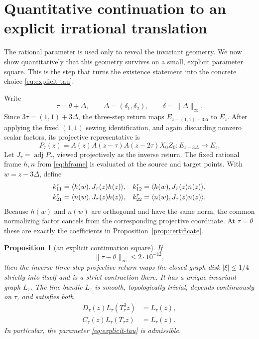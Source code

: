 \documentclass[11pt]{amsart}
\newtheorem{proposition}[theorem]{Proposition}
\theoremstyle{remark}
\newcommand{\adj}{\operatorname{adj}}
\begin{document}
\section{Quantitative continuation to an explicit irrational translation}\label{sec:perturb}

The rational parameter is used only to reveal the invariant geometry.  We now
show quantitatively that this geometry survives on a small, explicit
parameter square.  This is the step that turns the existence statement into
the concrete choice \eqref{eq:explicit-tau}.

Write
\[
 \tau=\theta+\Delta,
 \qquad
 \Delta=(\delta_1,\delta_2),
 \qquad
 \delta=\|\Delta\|_\infty.
\]
Since
$3\tau=(1,1)+3\Delta$, the three-step return maps
$E_{z-(1,1)-3\Delta}$ to $E_z$.  After applying the fixed $(1,1)$ sewing
identification, and again discarding nonzero scalar factors, its projective
representative is
\begin{equation}\label{eq:Ptau}
 P_\tau(z)=A(z)A(z-\tau)A(z-2\tau)X_0Z_0:
 E_{z-3\Delta}\longrightarrow E_z.
\end{equation}
Let $J_\tau=\adj P_\tau$, viewed projectively as the inverse return.  The
fixed rational frame $h,n$ from \eqref{eq:hframe} is evaluated at the source
and target points.  With $w=z-3\Delta$, define
\begin{align}\label{eq:pert-k}
 k_{11}^\tau&=\langle h(w),J_\tau(z)h(z)\rangle,&
 k_{12}^\tau&=\langle h(w),J_\tau(z)n(z)\rangle,\notag\\
 k_{21}^\tau&=\langle n(w),J_\tau(z)h(z)\rangle,&
 k_{22}^\tau&=\langle n(w),J_\tau(z)n(z)\rangle.
\end{align}
Because $h(w)$ and $n(w)$ are orthogonal and have the same norm, the common
normalizing factor cancels from the corresponding projective coordinate.
At $\tau=\theta$ these are exactly the coefficients in
Proposition~\ref{prop:certificate}.

\begin{proposition}[an explicit continuation square]\label{prop:explicit-square}
If
\begin{equation}\label{eq:explicit-square}
 \|\tau-\theta\|_\infty\le 2\cdot10^{-12},
\end{equation}
then the inverse three-step projective return maps the closed graph disk
$|\xi|\le1/4$ strictly into itself and is a strict contraction there.  It has
a unique invariant graph $L_\tau$.  The line bundle $L_\tau$ is smooth,
topologically trivial, depends continuously on $\tau$, and satisfies both
\begin{align}
 D_\tau(z)L_\tau(T_\tau^3z)&=L_\tau(z),                 \label{eq:three-inv}\\
 C_\tau(z)L_\tau(T_\tau z)&=L_\tau(z).                 \label{eq:one-inv}
\end{align}
In particular, the parameter \eqref{eq:explicit-tau} is admissible.
\end{proposition}
\end{document}
